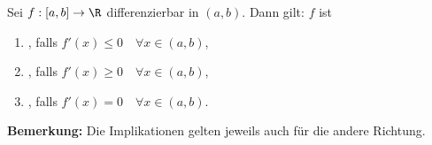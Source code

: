 Sei $f: [a, b] \to \R$ differenzierbar in $(a, b)$. Dann gilt: $f$ ist
\begin{enumerate}[label=\alph*)]
    \item {}, falls $f'(x) \leq 0 \quad \forall x \in (a, b)$,
    \item {}, falls $f'(x) \geq 0 \quad \forall x \in (a, b)$,
    \item {}, falls $f'(x) = 0 \quad \forall x \in (a, b)$.
\end{enumerate}
\textbf{Bemerkung:} Die Implikationen gelten jeweils auch für die andere Richtung.